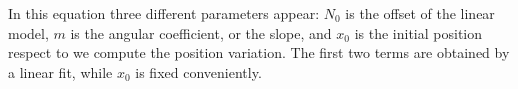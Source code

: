 In this equation three different parameters appear: $N_{0}$ is the offset of the linear model, $m$ is the angular coefficient, or the slope, and $x_{0}$ is the initial position respect to we compute the position variation. The first two terms are obtained by a linear fit, while $x_{0}$ is fixed conveniently.

\begin{figure}[hbtp]
\centering
{}
\end{figure}


